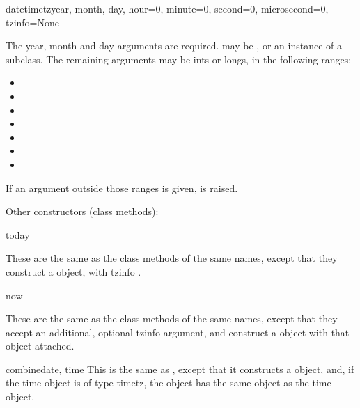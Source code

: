 \begin{funcdesc}{datetimetz}{year, month, day,
               hour=0, minute=0, second=0, microsecond=0, tzinfo=None}

    The year, month and day arguments are required.   may
    be , or an instance of a  subclass.  The
    remaining arguments may be ints or longs, in the following ranges:

\begin{itemize}
  \item {}
  \item {}
  \item {}
  \item {}
  \item {}
  \item {}
  \item {}
\end{itemize}

    If an argument outside those ranges is given,
     is raised.
\end{funcdesc}

Other constructors (class methods):

\begin{funcdesc}{today}{}

    These are the same as the  class methods of the
    same names, except that they construct a 
    object, with tzinfo .
\end{funcdesc}

\begin{funcdesc}{now}{}

    These are the same as the  class methods of the same names,
    except that they accept an additional, optional tzinfo argument, and
    construct a  object with that  object attached.
\end{funcdesc}

\begin{funcdesc}{combine}{date, time}
    This is the same as , except that it constructs
    a  object, and, if the time object is of type timetz,
    the  object has the same  object as the time object.
\end{funcdesc}

